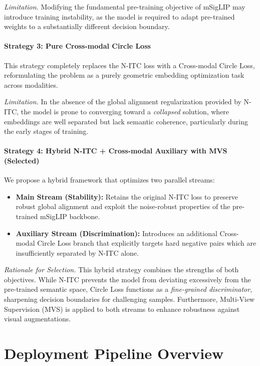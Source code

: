 \documentclass[../main.tex]{subfiles}
\begin{document}
\textit{Limitation.} Modifying the fundamental pre-training objective of mSigLIP may introduce training instability, as the model is required to adapt pre-trained weights to a substantially different decision boundary.

\paragraph{Strategy 3: Pure Cross-modal Circle Loss}
This strategy completely replaces the N-ITC loss with a Cross-modal Circle Loss, reformulating the problem as a purely geometric embedding optimization task across modalities.

\textit{Limitation.} In the absence of the global alignment regularization provided by N-ITC, the model is prone to converging toward a \emph{collapsed} solution, where embeddings are well separated but lack semantic coherence, particularly during the early stages of training.

\paragraph{Strategy 4: Hybrid N-ITC + Cross-modal Auxiliary with MVS (Selected)}
We propose a hybrid framework that optimizes two parallel streams:

\begin{itemize}
    \item \textbf{Main Stream (Stability):} Retains the original N-ITC loss to preserve robust global alignment and exploit the noise-robust properties of the pre-trained mSigLIP backbone.
    \item \textbf{Auxiliary Stream (Discrimination):} Introduces an additional Cross-modal Circle Loss branch that explicitly targets hard negative pairs which are insufficiently separated by N-ITC alone.
\end{itemize}

\textit{Rationale for Selection.} This hybrid strategy combines the strengths of both objectives. While N-ITC prevents the model from deviating excessively from the pre-trained semantic space, Circle Loss functions as a \emph{fine-grained discriminator}, sharpening decision boundaries for challenging samples. Furthermore, Multi-View Supervision (MVS) is applied to both streams to enhance robustness against visual augmentations.

\section{Deployment Pipeline Overview}
\label{sec:deployment_methodology}
\end{document}
